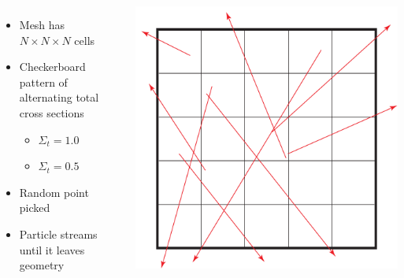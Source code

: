 \documentclass[color={usenames, dvipsnames},ignorenonframetext]{beamer}
\begin{document}
\begin{frame}
\begin{columns}[c]
\begin{itemize}
    \item Mesh has $N\times N \times N$ cells
      \item Checkerboard pattern of alternating total cross sections
          \begin{itemize}
              \item $\Sigma_t = 1.0$
              \item $\Sigma_t = 0.5$
          \end{itemize}
    \item Random point picked
    \item Particle streams until it leaves geometry
\end{itemize}

    \includegraphics[width=\textwidth, keepaspectratio]{MeshCompGraphic}
\end{columns}
\end{frame}
\end{document}
